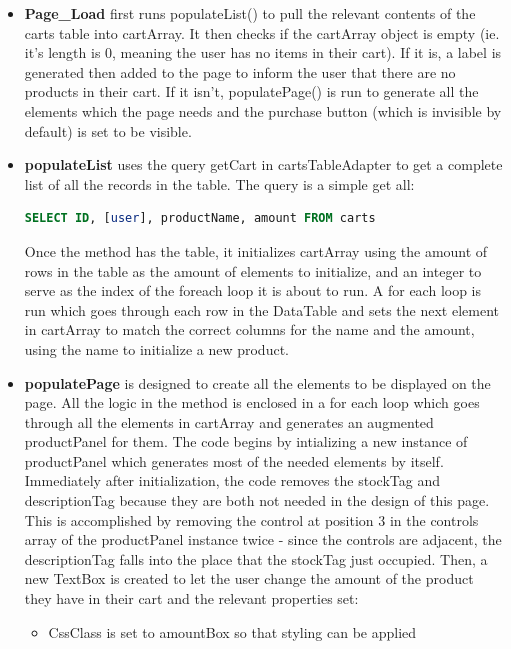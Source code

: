 ﻿\documentclass{article}
\begin{document}
    \begin{itemize}
        \item \textbf{Page\_Load} first runs populateList() to pull the relevant contents of the carts table into cartArray.
        It then checks if the cartArray object is empty (ie. it's length is 0, meaning the user has no items in their cart).
        If it is, a label is generated then added to the page to inform the user that there are no products in their cart.
        If it isn't, populatePage() is run to generate all the elements which the page needs and the purchase button (which is invisible by default) is set to be visible.
        \item \textbf{populateList} uses the query getCart in cartsTableAdapter to get a complete list of all the records in the table.
        The query is a simple get all:
        \begin{lstlisting}[language=SQL]
SELECT ID, [user], productName, amount FROM carts
        \end{lstlisting}
        Once the method has the table, it initializes cartArray using the amount of rows in the table as the amount of elements to initialize, and an integer to serve as the index of the foreach loop it is about to run.
        A for each loop is run which goes through each row in the DataTable and sets the next element in cartArray to match the correct columns for the name and the amount, using the name to initialize a new product.
        \item \textbf{populatePage} is designed to create all the elements to be displayed on the page.
        All the logic in the method is enclosed in a for each loop which goes through all the elements in cartArray and generates an augmented productPanel for them.
        The code begins by intializing a new instance of productPanel which generates most of the needed elements by itself.
        Immediately after initialization, the code removes the stockTag and descriptionTag because they are both not needed in the design of this page.
        This is accomplished by removing the control at position 3 in the controls array of the productPanel instance twice - since the controls are adjacent, the descriptionTag falls into the place that the stockTag just occupied.
        Then, a new TextBox is created to let the user change the amount of the product they have in their cart and the relevant properties set:
        \begin{itemize}
            \item CssClass is set to amountBox so that styling can be applied

\end{itemize}
\end{itemize}
\end{document}
